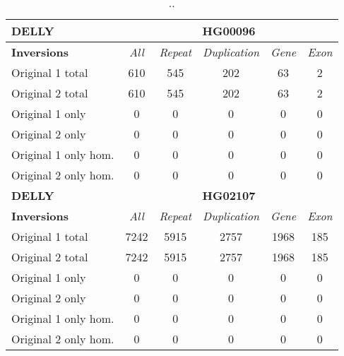 \begin{table}[htb]
\begin{center}
\begin{tabular}{|l|c||c|c|c|c|}
\hline
{\bf DELLY} & \multicolumn{5}{|c|}{\bf HG00096} \\
\hline
\cline{2-6}
{\bf Inversions} & {\it All} & {\it Repeat} & {\it Duplication} & {\it Gene} & {\it Exon} \\
\hline
Original 1 total & 610 & 545 & 202 & 63 & 2\\ 
\hline
Original 2 total & 610 & 545 & 202 & 63 & 2\\ 
\hline
Original 1 only & 0 & 0 & 0 & 0 & 0\\ 
\hline
Original 2 only & 0 & 0 & 0 & 0 & 0\\ 
\hline
Original 1 only hom. & 0 & 0 & 0 & 0 & 0\\ 
\hline
Original 2 only hom. & 0 & 0 & 0 & 0 & 0\\ 
\hline
\hline
{\bf DELLY} & \multicolumn{5}{|c|}{\bf HG02107} \\
\hline
\cline{2-6}
{\bf Inversions} & {\it All} & {\it Repeat} & {\it Duplication} & {\it Gene} & {\it Exon} \\
\hline
Original 1 total & 7242 & 5915 & 2757 & 1968 & 185\\ 
\hline
Original 2 total & 7242 & 5915 & 2757 & 1968 & 185\\ 
\hline
Original 1 only & 0 & 0 & 0 & 0 & 0\\ 
\hline
Original 2 only & 0 & 0 & 0 & 0 & 0\\ 
\hline
Original 1 only hom. & 0 & 0 & 0 & 0 & 0\\ 
\hline
Original 2 only hom. & 0 & 0 & 0 & 0 & 0\\ 
\hline
\end{tabular}
\end{center}
\caption{ .. }
\label{tab:orig-vs-orig2-delly-inv}
\end{table}

